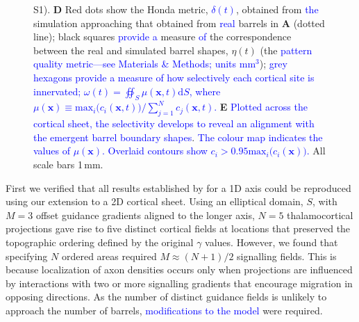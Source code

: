\documentclass[9pt,lineno]{elife}
\newcommand{\cmnt}[1]{\textcolor{blue}{#1}}
\newcommand{\mb}[1]{\mathbf{#1}}
\begin{document}
\begin{figure}
\begin{fullwidth}
{      S1). \textbf{D} Red dots show the Honda metric, \cmnt{$\delta(t)$}, obtained from \cmnt{the}
      simulation approaching that obtained from \cmnt{real} barrels in \textbf{A} (dotted
      line); black squares \cmnt{provide a} measure \cmnt{of} the correspondence
      between the real and
      simulated barrel shapes, $\eta(t)$ (the \cmnt{pattern quality metric---see
        Materials \& Methods; units mm$^3$});
      \cmnt{grey hexagons \cmnt{provide a measure of how selectively each
          cortical site is innervated};
        $\omega(t) = \oiint_{S} \mu(\mb{x},t) \mathrm{d}S$, where
        $\mu(\mb{x}) \equiv \mathrm{max}_i\big(c_i(\mb{x},t)\big)\big/\sum_{j=1}^{N} c_j(\mb{x},t)$.}
      \textbf{E} \cmnt{Plotted across the cortical sheet, the selectivity
        develops to reveal an alignment with the emergent barrel boundary
        shapes}. \cmnt{The colour map
        indicates the values of $\mu(\mb{x})$. Overlaid
        contours show $c_i > 0.95 \mathrm{max}_i\big(c_i(\mb{x})\big)$.} All scale bars 1\,mm.}
    \label{fig:main}
  \end{fullwidth}
\end{figure}

First we verified that all results established by \cite{karbowski_model_2004}
for a 1D axis could be reproduced using our extension to a 2D cortical
sheet. Using an elliptical domain, $S$, with $M=3$ offset guidance gradients
aligned to the longer axis, $N=5$ thalamocortical projections gave rise to
five distinct cortical fields at locations that preserved the topographic
ordering defined by the original $\gamma$ values. However, we found that
specifying $N$ ordered areas required $M\approx (N+1)/2$ signalling
fields. This is because localization of axon densities occurs only when
projections are influenced by interactions with two or more signalling
gradients that encourage migration in opposing directions.
%
%
As the number of distinct guidance fields is unlikely to
approach the number of barrels, \cmnt{modifications to the model} were required.
\end{document}
